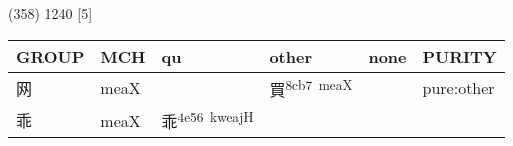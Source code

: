 \documentclass[14pt,a4paper]{scrartcl}
\begin{document}
(358) 1240 {[}5{]}

\begin{longtable}[c]{@{}llllll@{}}
\toprule
\begin{minipage}[b]{0.14\columnwidth}\raggedright\strut
GROUP
\strut\end{minipage} &
\begin{minipage}[b]{0.14\columnwidth}\raggedright\strut
MCH
\strut\end{minipage} &
\begin{minipage}[b]{0.14\columnwidth}\raggedright\strut
qu
\strut\end{minipage} &
\begin{minipage}[b]{0.14\columnwidth}\raggedright\strut
other
\strut\end{minipage} &
\begin{minipage}[b]{0.14\columnwidth}\raggedright\strut
none
\strut\end{minipage} &
\begin{minipage}[b]{0.14\columnwidth}\raggedright\strut
PURITY
\strut\end{minipage}\tabularnewline
\midrule
\endhead
\begin{minipage}[t]{0.14\columnwidth}\raggedright\strut
网
\strut\end{minipage} &
\begin{minipage}[t]{0.14\columnwidth}\raggedright\strut
meaX
\strut\end{minipage} &
\begin{minipage}[t]{0.14\columnwidth}\raggedright\strut
\strut\end{minipage} &
\begin{minipage}[t]{0.14\columnwidth}\raggedright\strut
買\textsuperscript{8cb7~meaX}
\strut\end{minipage} &
\begin{minipage}[t]{0.14\columnwidth}\raggedright\strut
\strut\end{minipage} &
\begin{minipage}[t]{0.14\columnwidth}\raggedright\strut
pure:other
\strut\end{minipage}\tabularnewline
\begin{minipage}[t]{0.14\columnwidth}\raggedright\strut
乖
\strut\end{minipage} &
\begin{minipage}[t]{0.14\columnwidth}\raggedright\strut
meaX
\strut\end{minipage} &
\begin{minipage}[t]{0.14\columnwidth}\raggedright\strut
乖\textsuperscript{4e56~kweajH}

\end{minipage}
\end{longtable}
\end{document}
